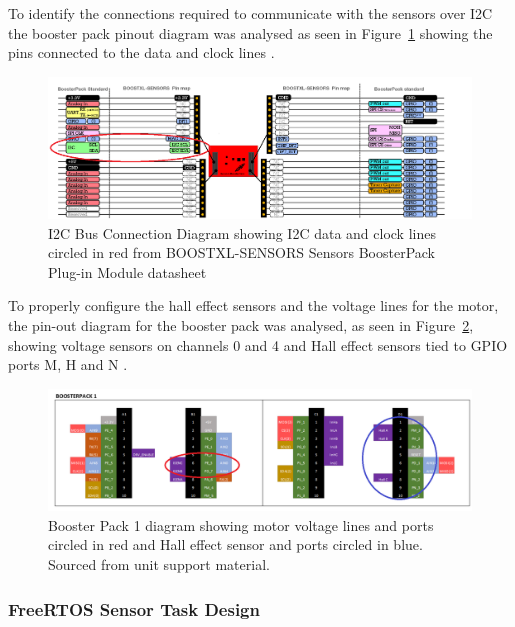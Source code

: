\documentclass[a4paper, 11pt, titlepage]{article}
\begin{document}
To identify the connections required to communicate with the sensors over I2C the booster pack pinout diagram was analysed as seen in Figure~\ref{fig:i2c-connections} showing the pins connected to the data and clock lines \parencite{boosterpack} \parencite{ek-tm4c1294xl} \parencite{tm4c129ncpdt}.\\

\begin{figure}[H]
    \centering
    \includegraphics[width=0.8\linewidth]{images/I2C_connections.png}
    \caption{I2C Bus Connection Diagram showing I2C data and clock lines circled in red from BOOSTXL-SENSORS Sensors BoosterPack Plug-in
    Module datasheet}
    \label{fig:i2c-connections}
\end{figure}

To properly configure the hall effect sensors and the voltage lines for the motor, the pin-out diagram for the booster pack was analysed, as seen in Figure~\ref{fig:motor-connections}, showing voltage sensors on channels 0 and 4 and Hall effect sensors tied to GPIO ports M, H and N \parencite{egh456support}.\\

\begin{figure}[H]
    \centering
    \includegraphics[width=0.8\linewidth]{images/Motor_connections.png}
    \caption{Booster Pack 1 diagram showing motor voltage lines and ports circled in red and Hall effect sensor and ports circled in blue. Sourced from unit support material.}
    \label{fig:motor-connections}
\end{figure}


\subsubsection{FreeRTOS Sensor Task Design}
\end{document}
